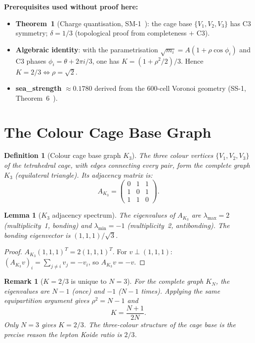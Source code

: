 \documentclass[11pt]{article}
\newtheorem{lemma}[theorem]{Lemma}
\newtheorem{definition}{Definition}[section]
\newtheorem{remark}{Remark}[section]
\begin{document}
\textbf{Prerequisites used without proof here:}
\begin{itemize}
\item \textbf{Theorem~1} (Charge quantisation, SM-1~\cite{abshier_sm1}):
  the cage base $\{V_1,V_2,V_3\}$ has C3 symmetry; $\delta = 1/3$
  (topological proof from completeness $+$ C3).
\item \textbf{Algebraic identity}: with the parametrisation
  $\sqrt{m_i} = A(1+\rho\cos\phi_i)$ and C3 phases $\phi_i = \theta+2\pi i/3$,
  one has $K = (1+\rho^2/2)/3$.  Hence $K = 2/3 \Leftrightarrow \rho = \sqrt{2}$.
\item \textbf{sea\_strength} $\approx 0.1780$ derived from the
  600-cell Voronoi geometry (SS-1, Theorem~6~\cite{abshier_ss1}).
\end{itemize}

\section{The Colour Cage Base Graph}

\begin{definition}[Colour cage base graph $K_3$]
The three colour vertices $\{V_1,V_2,V_3\}$ of the tetrahedral cage,
with edges connecting every pair, form the complete graph $K_3$
(equilateral triangle).  Its adjacency matrix is:
\[
A_{K_3} = \begin{pmatrix}0&1&1\\1&0&1\\1&1&0\end{pmatrix}.
\]
\end{definition}

\begin{lemma}[$K_3$ adjacency spectrum]
\label{lem:K3spec}
The eigenvalues of $A_{K_3}$ are
$\lambda_{\max} = 2$ (multiplicity~1, bonding) and
$\lambda_{\min} = -1$ (multiplicity~2, antibonding).
The bonding eigenvector is $(1,1,1)/\sqrt{3}$.
\end{lemma}

\begin{proof}
$A_{K_3}(1,1,1)^T = 2(1,1,1)^T$.  For $v\perp(1,1,1)$:
$(A_{K_3}v)_i = \sum_{j\neq i}v_j = -v_i$, so $A_{K_3}v = -v$.
\end{proof}

\begin{remark}[$K = 2/3$ is unique to $N=3$]
For the complete graph $K_N$, the eigenvalues are $N-1$ (once) and $-1$
($N-1$ times).  Applying the same equipartition argument gives
$\rho^2 = N-1$ and
\[
K = \frac{N+1}{2N}.
\]
Only $N=3$ gives $K=2/3$.  The three-colour structure of the cage base
is the precise reason the lepton Koide ratio is $2/3$.
\end{remark}
\end{document}
